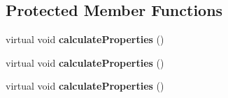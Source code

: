 \subsection*{Protected Member Functions}
\begin{DoxyCompactItemize}
\item 
\mbox{\label{class_prv_without_desuperheating_a453e703a9a6fe717e43d26da4d207062}} 
virtual void {\bfseries calculate\+Properties} ()
\item 
\mbox{\label{class_prv_without_desuperheating_a21b83699492a9b33428ef0ac93bbbc8d}} 
virtual void {\bfseries calculate\+Properties} ()
\item 
\mbox{\label{class_prv_without_desuperheating_a21b83699492a9b33428ef0ac93bbbc8d}} 
virtual void {\bfseries calculate\+Properties} ()
\end{DoxyCompactItemize}
